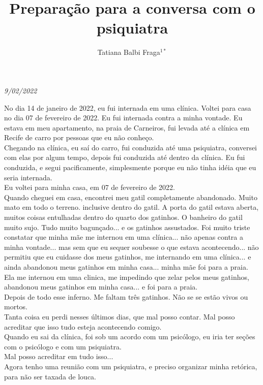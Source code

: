 \documentclass{book}
\title{Preparação para a conversa com o psiquiatra}
\author{Tatiana Balbi Fraga$^{1*}$}
\begin{document}
\emph{9/02/2022}

No dia 14 de janeiro de 2022, eu fui internada em uma clínica. Voltei para casa no dia 07 de fevereiro de 2022. Eu fui internada contra a minha vontade. Eu estava em meu apartamento, na praia de Carneiros, fui levada até a clínica em Recife de carro por pessoas que eu não conheço. \\

Chegando na clínica, eu saí do carro, fui conduzida até uma psiquiatra, conversei com elas por algum tempo, depois fui conduzida até dentro da clínica. Eu fui conduzida, e segui pacificamente, simplesmente porque eu não tinha idéia que eu seria internada. \\

Eu voltei para minha casa, em 07 de fevereiro de 2022. \\

Quando cheguei em casa, encontrei meu gatil completamente abandonado. Muito mato em todo o terreno. inclusive dentro do gatil. A porta do gatil estava aberta, muitos coisas entulhadas dentro do quarto dos gatinhos. O banheiro do gatil muito sujo. Tudo muito bagunçado... e os gatinhos assustados. Foi muito triste constatar que minha mãe me internou em uma clínica... não apenas contra a minha vontade... mas sem que eu sequer soubesse o que estava acontecendo... não permitiu que eu cuidasse dos meus gatinhos, me internando em uma clínica... e ainda abandonou meus gatinhos em minha casa... minha mãe foi para a praia. \\

Ela me internou em uma clinica, me impedindo que zelar pelos meus gatinhos, abandonou meus gatinhos em minha casa... e foi para a praia.\\

Depois de todo esse inferno. Me faltam três gatinhos. Não se se estão vivos ou mortos. \\

Tanta coisa eu perdi nesses últimos dias, que mal posso contar. Mal posso acreditar que isso tudo esteja acontecendo comigo. \\

Quando eu sai da clínica, foi sob um acordo com um psicólogo, eu iria ter seções com o psicólogo e com um psiquiatra.\\

Mal posso acreditar em tudo isso... \\

Agora tenho uma reunião com um psiquiatra, e preciso organizar minha retórica, para não ser taxada de louca. \\
\end{document}
